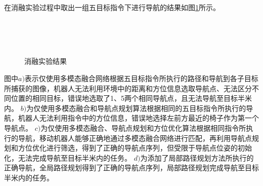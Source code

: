 在消融实验过程中取出一组五目标指令下进行导航的结果如图\ref{Ablationfig}所示。
\begin{figure}[htbp]
    \centering
    \\
    \\
    \\
    \caption{消融实验结果}
    \label{Ablationfig}
\end{figure}
图中$a)$表示仅使用多模态融合网络根据五目标指令所执行的路径和导航到各子目标所捕获的图像，机器人无法利用环境中的距离和方位信息选取导航点、无法区分不同位置的相同目标，错误地选取了1、5两个相同导航点，且无法导航至目标半米内。
$b)$为仅使用多模态融合和导航点规划算法根据相同的五目标指令所执行的导航，机器人无法利用指令中的方位信息，错误地选择左前方最近的椅子作为第一个导航点。
$c)$为仅使用多模态融合、导航点规划和方位优化算法根据相同指令所执行的导航，移动机器人能够正确地通过多模态融合网络进行匹配，再利用导航点规划和方位优化进行筛选，得到了正确的导航点序列，但受限于导航点位姿的初始化，无法完成导航至目标半米内的任务。
$d)$为添加了局部路径规划方法所执行的正确导航，全局路径规划得到了正确的导航点序列，局部路径规划完成导航至目标半米内的任务。


